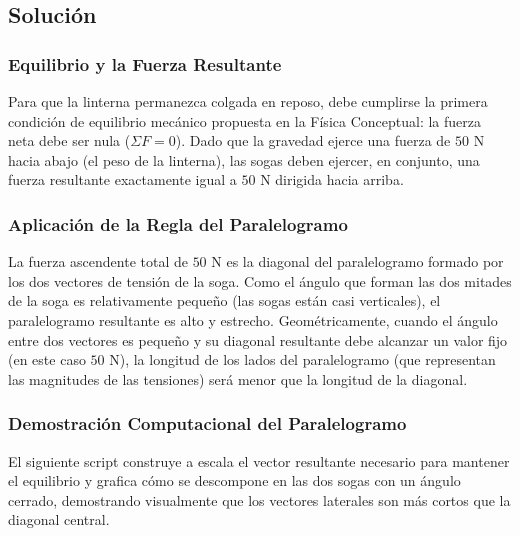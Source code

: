 \documentclass[12pt,letterpaper]{article}
\begin{document}
\subsection*{Solución}

\subsubsection*{Equilibrio y la Fuerza Resultante}
Para que la linterna permanezca colgada en reposo, debe cumplirse la primera condición de equilibrio mecánico propuesta en la Física Conceptual: la fuerza neta debe ser nula ($\Sigma F = 0$). Dado que la gravedad ejerce una fuerza de $50\text{ N}$ hacia abajo (el peso de la linterna), las sogas deben ejercer, en conjunto, una fuerza resultante exactamente igual a $50\text{ N}$ dirigida hacia arriba.

\subsubsection*{Aplicación de la Regla del Paralelogramo}
La fuerza ascendente total de $50\text{ N}$ es la diagonal del paralelogramo formado por los dos vectores de tensión de la soga. Como el ángulo que forman las dos mitades de la soga es relativamente pequeño (las sogas están casi verticales), el paralelogramo resultante es alto y estrecho. 
Geométricamente, cuando el ángulo entre dos vectores es pequeño y su diagonal resultante debe alcanzar un valor fijo (en este caso $50\text{ N}$), la longitud de los lados del paralelogramo (que representan las magnitudes de las tensiones) será menor que la longitud de la diagonal.

\subsubsection*{Demostración Computacional del Paralelogramo}
El siguiente script construye a escala el vector resultante necesario para mantener el equilibrio y grafica cómo se descompone en las dos sogas con un ángulo cerrado, demostrando visualmente que los vectores laterales son más cortos que la diagonal central.
\end{document}
